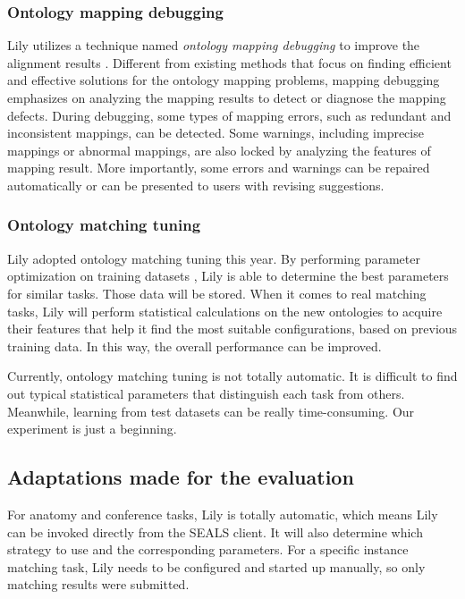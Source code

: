 \documentclass[runningheads]{llncs}
\begin{document}
\subsubsection{Ontology mapping debugging} Lily utilizes a technique named \textit{ontology mapping debugging} to improve the alignment results \cite{wang2012debugging}. Different from existing methods that focus on finding efficient and effective solutions for the ontology mapping problems, mapping debugging emphasizes on analyzing the mapping results to detect or diagnose the mapping defects. During debugging, some types of mapping errors, such as redundant and inconsistent mappings, can be detected. Some warnings, including imprecise mappings or abnormal mappings, are also locked by analyzing the features of mapping result. More importantly, some errors and warnings can be repaired automatically or can be presented to users with revising suggestions. \par
\subsubsection{Ontology matching tuning} Lily adopted ontology matching tuning this year. By performing parameter optimization on training datasets \cite{yang2014ontology}, Lily is able to determine the best parameters for similar tasks. Those data will be stored. When it comes to real matching tasks, Lily will perform statistical calculations on the new ontologies to acquire their features that help it find the most suitable configurations, based on previous training data. In this way, the overall performance can be improved. \par
Currently, ontology matching tuning is not totally automatic. It is difficult to find out typical statistical parameters that distinguish each task from others. Meanwhile, learning from test datasets can be really time-consuming. Our experiment is just a beginning. \par

\subsection{Adaptations made for the evaluation}
For anatomy and conference tasks, Lily is totally automatic, which means Lily can be invoked directly from the SEALS client. It will also determine which strategy to use and the corresponding parameters. For a specific instance matching task, Lily needs to be configured and started up manually, so only matching results were submitted. \par
\end{document}
